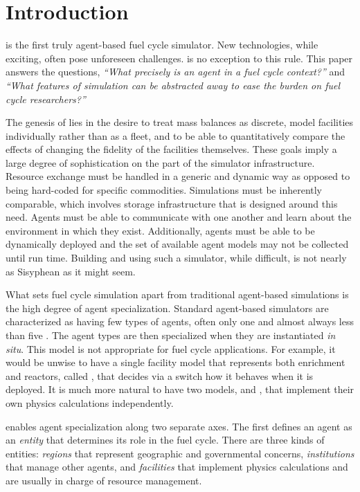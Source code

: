 \section{Introduction}
\label{sec-intro}

\Cyclus \cite{cyclus_v1_0,cyclus_v1_2} is the first truly agent-based 
\cite{jennings2000agent} fuel cycle simulator. 
New technologies, while exciting, often pose unforeseen challenges.
\Cyclus is no exception to this rule.  This paper answers the questions,
\emph{``What precisely is an agent in a fuel cycle context?''} and 
\emph{``What features of simulation can be abstracted away to ease the burden 
on fuel cycle researchers?''}

The genesis of \cyclus lies in the desire to 
treat mass balances as discrete, model facilities individually rather than as 
a fleet, and to be able to quantitatively compare the effects of changing the 
fidelity of the facilities themselves. These goals imply a large degree of 
sophistication on the part of the simulator infrastructure.  Resource exchange
must be handled in a generic and dynamic way as opposed to being hard-coded 
for specific commodities. Simulations must be inherently comparable, which involves 
storage infrastructure that is designed around this need. Agents must be able 
to communicate with one another and learn about the environment in which they 
exist. Additionally, agents must be able to be dynamically deployed and the set of 
available agent models may not be collected until run time. Building and using such a
simulator, while difficult, is not nearly as Sisyphean as it might seem. 

What sets fuel cycle simulation apart from traditional agent-based simulations 
is the high degree of agent specialization. Standard agent-based simulators
are characterized as having few types of agents, often only one and 
almost always less than five \cite{taylor2014agent}. The agent types are then 
specialized 
when they are instantiated \emph{in situ}. This model is not appropriate for 
fuel cycle applications.  For example, it would be unwise to have a single facility model 
that represents both enrichment and reactors, called ,
that decides via a switch how it behaves when it is deployed. It is much 
more natural to have two models,  and , 
that implement their own physics calculations independently.

\Cyclus enables agent specialization along two separate axes. The first defines 
an agent as an \emph{entity} that determines its role in the 
fuel cycle. There are three kinds of entities: \emph{regions} that 
represent geographic and governmental concerns, \emph{institutions} 
that manage other agents, and \emph{facilities} that implement 
physics calculations and are usually in charge of resource management.

